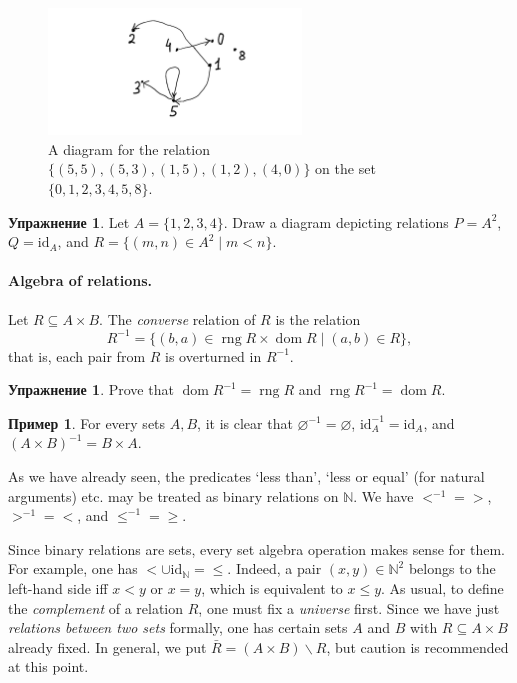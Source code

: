 \documentclass[12pt,notitlepage]{article}
\theoremstyle{plain}
\theoremstyle{definition}
\newtheorem{exc}[thm]{Упражнение}
\newtheorem{exm}[thm]{Пример}
\theoremstyle{plain}
\newcommand{\N}{\mathbb{N}}
\newcommand{\sbs}{\subseteq}
\renewcommand{\setminus}{\smallsetminus}
\newcommand{\void}{\varnothing}
\newcommand{\dom}{\mathop{\mathrm{dom}}}
\newcommand{\rng}{\mathop{\mathrm{rng}}}
\newcommand{\id}{\mathrm{id}}
\newcommand{\1}{\mathbf{1}}
\newcommand{\0}{\mathbf{0}}
\begin{document}
\begin{figure}[h]
	\centering
	\includegraphics*[width=0.6\textwidth]{rel_diag.pdf}
	\caption{A diagram for the relation $\{ (5,5), (5,3), (1,5), (1,2), (4, 0) \}$ on the set $\{0, 1, 2, 3, 4, 5, 8\}$.}
\end{figure}


\begin{exc}
	Let $A = \{1,2,3,4\}$. Draw a diagram depicting relations $P = A^2$, $Q = \id_A$, and $R = \{ (m,n) \in A^2 \mid m < n\}$.
\end{exc}

\paragraph{Algebra of relations.} Let $R \sbs A \times B$. The \emph{converse} relation of $R$ is the relation
$$R^{-1} = \{(b,a) \in \rng R \times \dom R \mid (a, b) \in R\},$$
that is, each pair from $R$ is overturned in $R^{-1}$.

\begin{exc}
	Prove that $\dom R^{-1} = \rng R$ and $\rng R^{-1} = \dom R$.
\end{exc}

\begin{exm}
	For every sets $A, B$, it is clear that $\void^{-1} = \void$, $\id^{-1}_A = \id_A$, and $(A \times B)^{-1} = B \times A$.
	
	As we have already seen, the predicates `less than', `less or equal' (for natural arguments) etc. may be treated as binary relations on $\N$. We have ${<}^{-1} = {>}$, ${>}^{-1} = {<}$, and ${\leq}^{-1} = {\geq}$.
\end{exm}

Since binary relations are sets, every set algebra operation makes sense for them. For example, one has ${<} \cup \id_\N = {\leq}$. Indeed, a pair $(x, y) \in \N^2$ belongs to the left-hand side iff $x < y$ or $x = y$, which is equivalent to $x \leq y$. As usual, to define the \emph{complement} of a relation $R$, one must fix a \emph{universe} first. Since we have just \emph{relations between two sets} formally, one has certain sets $A$ and $B$ with $R \sbs A \times B$ already fixed. In general, we put $\bar R = (A \times B) \setminus R$, but caution is recommended at this point.
\end{document}
